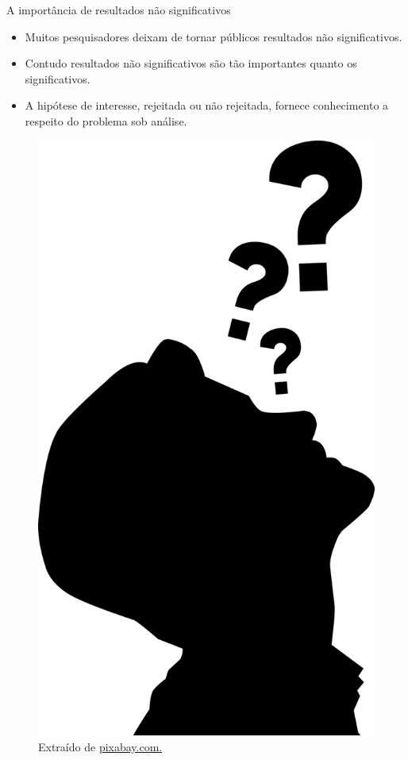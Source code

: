 \documentclass[
  ignorenonframetext,
  serif,
  professionalfont,
  usenames,
  dvipsnames,
  aspectratio = 169]{beamer}
\providecommand{\tightlist}{%
  \setlength{\itemsep}{0pt}\setlength{\parskip}{0pt}}
\renewcommand{\tightlist}{%
  \setlength{\itemsep}{0\baselineskip}
  \setlength{\parskip}{0.25\baselineskip}
}
\def\beginAHalfColumn{\begin{minipage}{0.49\textwidth}}%
\def\endColumns{\end{minipage}}%
\begin{document}
\begin{frame}{A importância de resultados não significativos}
\label{a-importuxe2ncia-de-resultados-nuxe3o-significativos}
\beginAHalfColumn

\begin{itemize}
\tightlist
\item
  Muitos pesquisadores deixam de tornar públicos resultados não
  significativos.
\end{itemize}

\vspace{0.3cm}

\begin{itemize}
\tightlist
\item
  Contudo resultados não significativos são tão importantes quanto os
  significativos.
\end{itemize}

\vspace{0.3cm}

\begin{itemize}
\tightlist
\item
  A hipótese de interesse, rejeitada ou não rejeitada, fornece
  conhecimento a respeito do problema sob análise.
\end{itemize}

\endColumns
\beginAHalfColumn

\begin{figure}

{\centering \includegraphics[width=0.4\linewidth]{./img/duvida} 

}

\caption{Extraído de \href{https://cdn.pixabay.com/photo/2021/11/04/14/36/doubt-6768418_1280.png}{pixabay.com.}}\label{fig:unnamed-chunk-7}
\end{figure}

\endColumns
\end{frame}
\end{document}

